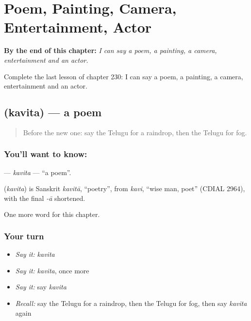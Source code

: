 
\chapter{Poem, Painting, Camera, Entertainment, Actor}
\label{ch:te-poem-painting-camera-entertainment-actor}

\begin{chapteropening}
\textbf{By the end of this chapter:} \emph{I can say a poem, a painting, a camera, entertainment and an actor.}

Complete the last lesson of chapter 230: I can say a poem, a painting, a camera, entertainment and an actor.
\end{chapteropening}

\section[\texorpdfstring{\te{కవిత} (kavita)}{కవిత (kavita)}]{ (kavita) — a poem}

\label{lesson:TE-C230-kavita}



\begin{quote}
Before the new one: say the Telugu for a raindrop, then the Telugu for fog.
\end{quote}

\subsection*{You'll want to know: }
\textbf{} — \emph{kavita} — \textquotedblleft{}a poem\textquotedblright{}.

\begin{cousinweb}
\textbf{} (\emph{kavita}) is Sanskrit \emph{kavitā}, \textquotedblleft{}poetry\textquotedblright{}, from \emph{kavi}, \textquotedblleft{}wise man, poet\textquotedblright{} (CDIAL 2964), with the final \emph{-ā} shortened.
\end{cousinweb}

\begin{grammarlens}[title={What you've built}]
One more word for this chapter.
\end{grammarlens}

\subsection*{Your turn}
\begin{itemize}
\raggedright
  \item \emph{Say it:} \emph{kavita}
  \item \emph{Say it:} \emph{kavita}, once more
  \item \emph{Say it:} say \emph{kavita}
  \item \emph{Recall:} say the Telugu for a raindrop, then the Telugu for fog, then say \emph{kavita} again
\end{itemize}

